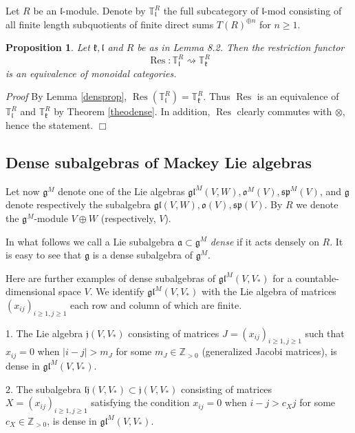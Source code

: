 \documentclass[10pt]{amsart}
\newcounter{theorem}
\newtheorem{prop}[theo]{Proposition}
\renewenvironment{proof}{ \emph{Proof}}{$\Box$}
\newcommand {\ZZ} {\mathbb {Z}}
\newcommand{\TT}{\mathbb{T}}
\newcommand{\jj}{\mathfrak{j}}
\renewcommand{\sp}{\mathfrak{sp}}
\newcommand{\kk}{\mathfrak{k}}
\newcommand{\oo}{\mathfrak{o}}
\renewcommand{\aa}{\mathfrak{a}}
\renewcommand{\gg}{\mathfrak{g}}
\renewcommand{\ll}{\mathfrak{l}}
\newcommand{\gl}{\mathfrak{gl}}
\begin{document}
Let $R$ be an $\ll$-module.
Denote by $\TT^R_{\ll}$ the full subcategory of $\ll$-mod consisting of all finite length subquotients of finite direct sums $T(R)^{\oplus n}$ for $n \geq 1$.

\begin{prop}\label{prop_eqcat} Let $\kk,\ll$ and $R$ be as in Lemma 8.2. Then the restriction functor
\begin{equation}\label{rest_fact}
 \operatorname{Res}:\TT^R_{\ll} \rightsquigarrow \TT^R_{\kk}
\end{equation}
is an equivalence of monoidal categories.
\end{prop}

\begin{proof} By Lemma \ref{densprop},  $\operatorname{Res}(\TT^R_{\ll})=\TT^R_{\kk}$. Thus $\operatorname{Res}$ is an equivalence of $\TT_{\ll}^R$ and $\TT_{\kk}^R$ by Theorem \ref{theodense}. In addition, $\operatorname{Res}$ clearly commutes with $\otimes$, hence the statement.
\end{proof}


\subsection{Dense subalgebras of Mackey Lie algebras}\label{sect:7.2}


Let now $\gg^M$ denote one of the Lie algebras $\gl^M(V,W), \oo^M(V), \sp^M(V)$, and $\gg$ denote respectively the subalgebra $\gl(V,W), \oo(V), \sp(V)$.
By $R$ we denote the $\gg^M$-module $V\oplus W$ (respectively, $V$).

In what follows we call a Lie subalgebra 
$\aa\subset \gg^M$ \textit{dense} if it acts densely on $R$.
It is easy to see that $\gg$ is a dense subalgebra of $\gg^M$.

Here are further examples of dense subalgebras of $\gl^M(V,V_*)$ for a countable-dimensional space $V$. We identify $\gl^M(V,V_*)$ with the Lie algebra of matrices $(x_{ij})_{i\geq1,j\geq1}$ each row and column of which are finite. 

1. The Lie algebra $\jj(V,V_*)$ consisting of matrices $J = (x_{ij})_{i\geq1,j\geq1}$ such that $x_{ij}=0$ when 
$|i-j|>m_J$ for some $m_J \in \ZZ_{>0}$ (generalized Jacobi matrices), is dense in $\gl^M(V,V_*)$.

2. The subalgebra $\mathfrak{lj}(V,V_*) \subset \jj(V,V_*)$ consisting of matrices $X=(x_{ij})_{i\geq1,j\geq1}$ satisfying the condition $x_{ij}=0$ when $i-j>c_Xj$ for some $c_X \in \ZZ_{>0}$, is dense in $\gl^M(V,V_*)$.
\end{document}
